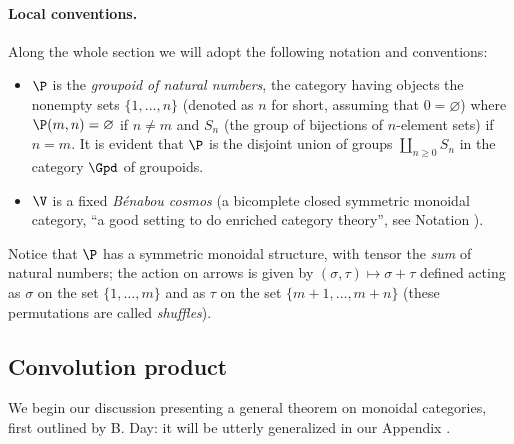 \paragraph{\bf Local conventions.} Along the whole section we will adopt the following notation and conventions:
\begin{itemize}
\item $\P$ is the \emph{groupoid of natural numbers}, \ie the category having objects the nonempty sets $\{1,\dots, n\}$ (denoted as $n$ for short, assuming that $0 = \varnothing$) where $\P(m,n)=\varnothing$ if $n\neq m$ and $S_n$ (the group of bijections of $n$-element sets) if $n=m$. It is evident that $\P$ is the disjoint union of groups $\coprod_{n\ge 0} S_n$ in the category $\Gpd$ of groupoids.
\item $\V$ is a fixed \emph{B\'enabou cosmos} (\ie a bicomplete closed symmetric monoidal category, ``a good setting to do enriched category theory'', see Notation ).
\end{itemize}
Notice that $\P$ has a symmetric monoidal structure, with tensor the \emph{sum} of natural numbers; the action on arrows is given by $(\sigma,\tau)\mapsto \sigma+\tau$ defined acting as $\sigma$ on the set $\{1,\dots, m\}$ and as $\tau$ on the set $\{m+1,\dots, m+n\}$ (these permutations are called \emph{shuffles}).
\subsection{Convolution product} We begin our discussion presenting a general theorem on monoidal categories, first outlined by B\@. Day: it will be utterly generalized in our Appendix .

